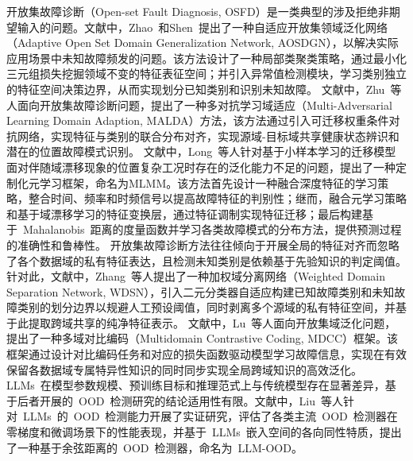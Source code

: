 开放集故障诊断（Open-set Fault Diagnosis, OSFD）是一类典型的涉及拒绝非期望输入的问题。文献\cite{ZHAO2022108672}中，Zhao~和Shen~提出了一种自适应开放集领域泛化网络（Adaptive Open Set Domain Generalization Network, AOSDGN），以解决实际应用场景中未知故障频发的问题。该方法设计了一种局部类聚类策略，通过最小化三元组损失挖掘领域不变的特征表征空间；并引入异常值检测模块，学习类别独立的特征空间决策边界，从而实现划分已知类别和识别未知故障。
文献\cite{10262196}中，Zhu~等人面向开放集故障诊断问题，提出了一种多对抗学习域适应（Multi-Adversarial Learning Domain Adaption, MALDA）方法，该方法通过引入可迁移权重条件对抗网络，实现特征与类别的联合分布对齐，实现源域-目标域共享健康状态辨识和潜在的位置故障模式识别。
文献\cite{10214410}中，Long~等人针对基于小样本学习的迁移模型面对伴随域漂移现象的位置复杂工况时存在的泛化能力不足的问题，提出了一种定制化元学习框架，命名为MLMM。该方法首先设计一种融合深度特征的学习策略，整合时间、频率和时频信号以提高故障特征的判别性；继而，融合元学习策略和基于域漂移学习的特征变换层，通过特征调制实现特征迁移；最后构建基于~Mahalanobis~距离的度量函数并学习各类故障模式的分布方法，提供预测过程的准确性和鲁棒性。
开放集故障诊断方法往往倾向于开展全局的特征对齐而忽略了各个数据域的私有特征表达，且检测未知类别是依赖基于先验知识的判定阈值。针对此，文献\cite{ZHANG2023109518}中，Zhang~等人提出了一种加权域分离网络（Weighted Domain Separation Network, WDSN），引入二元分类器自适应构建已知故障类别和未知故障类别的划分边界以规避人工预设阈值，同时剥离多个源域的私有特征空间，并基于此提取跨域共享的纯净特征表示。
文献\cite{10382502}中，Lu~等人面向开放集域泛化问题，提出了一种多域对比编码（Multidomain Contrastive Coding, MDCC）框架。该框架通过设计对比编码任务和对应的损失函数驱动模型学习故障信息，实现在有效保留各数据域专属特异性知识的同时同步实现全局跨域知识的高效泛化。
LLMs~在模型参数规模、预训练目标和推理范式上与传统模型存在显著差异，基于后者开展的~OOD~检测研究的结论适用性有限。文献\cite{20242516270368}中，Liu~等人针对~LLMs~的~OOD~检测能力开展了实证研究，评估了各类主流~OOD~检测器在零梯度和微调场景下的性能表现，并基于~LLMs~嵌入空间的各向同性特质，提出了一种基于余弦距离的~OOD~检测器，命名为~LLM-OOD。

